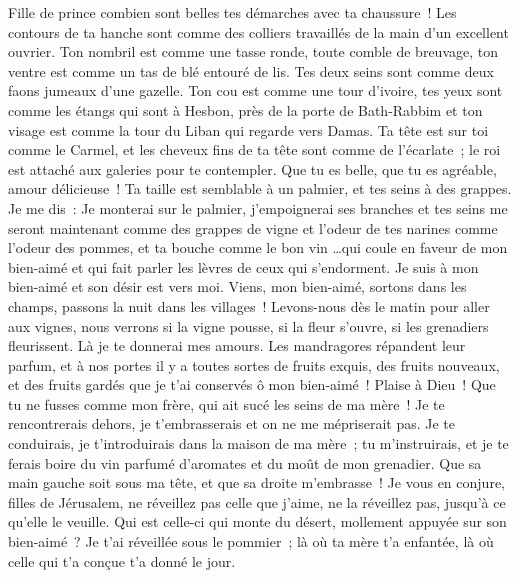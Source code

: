 \begin{multicols}{2}
 Fille de prince combien sont belles tes démarches avec ta chaussure~! Les contours de ta hanche sont comme des colliers travaillés de la main d'un excellent ouvrier.
Ton nombril est comme une tasse ronde, toute comble de breuvage, ton ventre est comme un tas de blé entouré de lis.
Tes deux seins sont comme deux faons jumeaux d'une gazelle.
Ton cou est comme une tour d'ivoire, tes yeux sont comme les étangs qui sont à Hesbon, près de la porte de Bath-Rabbim et ton visage est comme la tour du Liban qui regarde vers Damas.
Ta tête est sur toi comme le Carmel, et les cheveux fins de ta tête sont comme de l'écarlate~; le roi est attaché aux galeries pour te contempler.
 Que tu es belle, que tu es agréable, amour délicieuse~!
Ta taille est semblable à un palmier, et tes seins à des grappes.
Je me dis~: Je monterai sur le palmier, j'empoignerai ses branches et tes seins me seront maintenant comme des grappes de vigne et l'odeur de tes narines comme l'odeur des pommes,
et ta bouche comme le bon vin  …qui coule en faveur de mon bien-aimé et qui fait parler les lèvres de ceux qui s'endorment.
Je suis à mon bien-aimé et son désir est vers moi.
Viens, mon bien-aimé, sortons dans les champs, passons la nuit dans les villages~!
Levons-nous dès le matin pour aller aux vignes, nous verrons si la vigne pousse, si la fleur s'ouvre, si les grenadiers fleurissent. Là je te donnerai mes amours.
Les mandragores répandent leur parfum, et à nos portes il y a toutes sortes de fruits exquis, des fruits nouveaux, et des fruits gardés que je t'ai conservés ô mon bien-aimé~!
\VerseOne{} Plaise à Dieu~! Que tu ne fusses comme mon frère, qui ait sucé les seins de ma mère~! Je te rencontrerais dehors, je t'embrasserais et on ne me mépriserait pas.
Je te conduirais, je t'introduirais dans la maison de ma mère~; tu m'instruirais, et je te ferais boire du vin parfumé d'aromates et du moût de mon grenadier.
Que sa main gauche soit sous ma tête, et que sa droite m'embrasse~!
 Je vous en conjure, filles de Jérusalem, ne réveillez pas celle que j'aime, ne la réveillez pas, jusqu'à ce qu'elle le veuille.
 Qui est celle-ci qui monte du désert, mollement appuyée sur son bien-aimé~?  Je t'ai réveillée sous le pommier~; là où ta mère t'a enfantée, là où celle qui t'a conçue t'a donné le jour.

\end{multicols}
